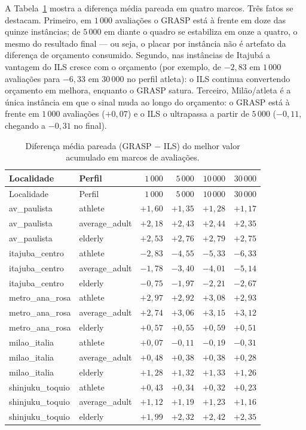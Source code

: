 \documentclass[11pt,a4paper]{article}
\begin{document}
A Tabela~\ref{tab:comp-cp} mostra a diferença média pareada em quatro marcos. Três fatos se destacam. Primeiro, em $1\,000$ avaliações o GRASP está à frente em doze das quinze instâncias; de $5\,000$ em diante o quadro se estabiliza em onze a quatro, o mesmo do resultado final — ou seja, o placar por instância não é artefato da diferença de orçamento consumido. Segundo, nas instâncias de Itajubá a vantagem do ILS cresce com o orçamento (por exemplo, de $-2{,}83$ em $1\,000$ avaliações para $-6{,}33$ em $30\,000$ no perfil atleta): o ILS continua convertendo orçamento em melhora, enquanto o GRASP satura. Terceiro, Milão/atleta é a única instância em que o sinal muda ao longo do orçamento: o GRASP está à frente em $1\,000$ avaliações ($+0{,}07$) e o ILS o ultrapassa a partir de $5\,000$ ($-0{,}11$, chegando a $-0{,}31$ no final).

\renewcommand{\arraystretch}{1.12}
\begin{longtable}{@{}l l r r r r@{}}
\caption{Diferença média pareada (GRASP $-$ ILS) do melhor valor acumulado em marcos de avaliações.}\label{tab:comp-cp}\\
\toprule
Localidade & Perfil & $1\,000$ & $5\,000$ & $10\,000$ & $30\,000$ \\
\midrule
\endfirsthead
\toprule
Localidade & Perfil & $1\,000$ & $5\,000$ & $10\,000$ & $30\,000$ \\
\midrule
\endhead
av\_paulista & athlete & $+1{,}60$ & $+1{,}35$ & $+1{,}28$ & $+1{,}17$ \\
av\_paulista & average\_adult & $+2{,}18$ & $+2{,}43$ & $+2{,}44$ & $+2{,}35$ \\
av\_paulista & elderly & $+2{,}53$ & $+2{,}76$ & $+2{,}79$ & $+2{,}75$ \\
itajuba\_centro & athlete & $-2{,}83$ & $-4{,}55$ & $-5{,}33$ & $-6{,}33$ \\
itajuba\_centro & average\_adult & $-1{,}78$ & $-3{,}40$ & $-4{,}01$ & $-5{,}14$ \\
itajuba\_centro & elderly & $-0{,}75$ & $-1{,}97$ & $-2{,}21$ & $-2{,}67$ \\
metro\_ana\_rosa & athlete & $+2{,}97$ & $+2{,}92$ & $+3{,}08$ & $+2{,}93$ \\
metro\_ana\_rosa & average\_adult & $+2{,}74$ & $+3{,}06$ & $+3{,}15$ & $+3{,}12$ \\
metro\_ana\_rosa & elderly & $+0{,}57$ & $+0{,}55$ & $+0{,}59$ & $+0{,}51$ \\
milao\_italia & athlete & $+0{,}07$ & $-0{,}11$ & $-0{,}19$ & $-0{,}31$ \\
milao\_italia & average\_adult & $+0{,}48$ & $+0{,}38$ & $+0{,}38$ & $+0{,}28$ \\
milao\_italia & elderly & $+1{,}28$ & $+1{,}32$ & $+1{,}33$ & $+1{,}26$ \\
shinjuku\_toquio & athlete & $+0{,}43$ & $+0{,}34$ & $+0{,}32$ & $+0{,}23$ \\
shinjuku\_toquio & average\_adult & $+1{,}12$ & $+1{,}19$ & $+1{,}23$ & $+1{,}16$ \\
shinjuku\_toquio & elderly & $+1{,}99$ & $+2{,}32$ & $+2{,}42$ & $+2{,}35$ \\
\bottomrule
\end{longtable}
\end{document}

